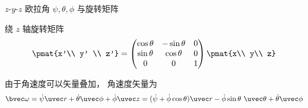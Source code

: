 
\begin{issues}
\issueDraft
\end{issues}

$z$-$y$-$z$ 欧拉角 $\psi,\theta,\phi$ 与旋转矩阵

绕 $z$ 轴旋转矩阵
\begin{equation}
\pmat{x'\\ y' \\ z'} =
\begin{pmatrix}
\cos\theta & - \sin\theta & 0\\
\sin\theta &\cos\theta & 0\\
0 & 0 & 1
\end{pmatrix}\pmat{x\\ y\\ z}
\end{equation}


由于角速度可以矢量叠加， 角速度矢量为
\begin{equation}
\bvec\omega
= \dot\psi\uvec r + \dot\theta\uvec\phi + \dot\phi\uvec z
= (\dot\psi + \dot\phi\cos\theta)\uvec r - \dot\phi\sin\theta\ \uvec\theta +
 \dot\theta\uvec\phi
\end{equation}
